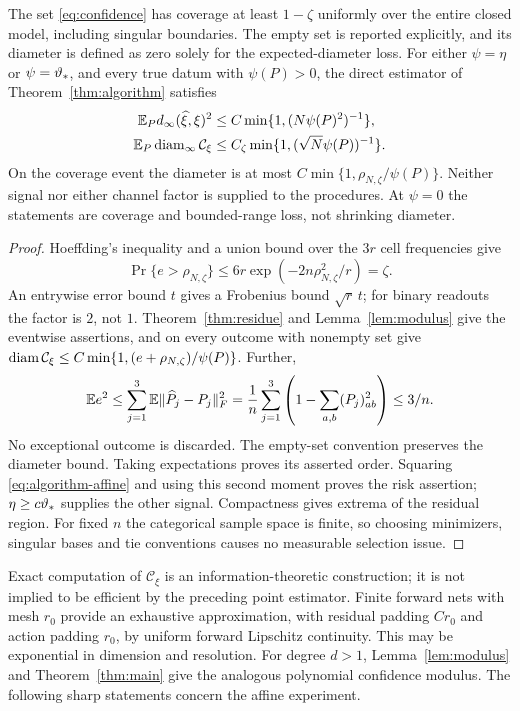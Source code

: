 \begin{theorem}\label{thm:upper}
The set \eqref{eq:confidence} has coverage at least $1-\zeta$
uniformly over the entire closed model, including singular boundaries.
The empty set is reported explicitly, and its diameter is defined as
zero solely for the expected-diameter loss. For either
$\psi=\eta$ or $\psi=\vartheta_*$, and every true datum with $\psi(P)>0$,
the direct estimator of Theorem~\ref{thm:algorithm} satisfies
\begin{align}
 \mathbb E_P d_\infty(\widehat\xi,\xi)^2
      &\le C\min\{1,(N\psi(P)^2)^{-1}\},\nonumber\\
 \mathbb E_P\operatorname{diam}_\infty\mathcal C_\xi
      &\le C_\zeta\min\{1,(\sqrt N\psi(P))^{-1}\}.
                                                        \label{eq:stat-upper}
\end{align}
On the coverage event the diameter is at most
$C\min\{1,\rho_{N,\zeta}/\psi(P)\}$.
Neither signal nor either channel factor is supplied to the procedures.
At $\psi=0$ the statements are coverage and bounded-range loss, not
shrinking diameter.
\end{theorem}
\begin{proof}
Hoeffding's inequality and a union bound over the $3r$ cell frequencies
give
\[
 \Pr\{e>\rho_{N,\zeta}\}
       \le6r\exp(-2n\rho_{N,\zeta}^2/r)=\zeta.
\]
An entrywise error bound $t$ gives a Frobenius bound $\sqrt r\,t$;
for binary readouts the factor is $2$, not $1$.
Theorem~\ref{thm:residue} and Lemma~\ref{lem:modulus} give the
eventwise assertions, and on every outcome with nonempty set give
$\operatorname{diam}\mathcal C_\xi\le C\min\{1,(e+\rho_{N,\zeta})/\psi(P)\}$.
Further,
\[
 \mathbb E e^2\le\sum_{j=1}^3\mathbb E\|\widehat P_j-P_j\|_F^2
       =\frac1n\sum_{j=1}^3
              \left(1-\sum_{a,b}(P_j)_{ab}^2\right)\le3/n.
\]
No exceptional outcome is discarded. The empty-set convention
preserves the diameter bound. Taking expectations proves its asserted
order. Squaring \eqref{eq:algorithm-affine} and using this second
moment proves the risk assertion; $\eta\ge c\vartheta_*$ supplies the
other signal. Compactness gives extrema of the residual region. For
fixed $n$ the categorical sample space is finite, so choosing
minimizers, singular bases and tie conventions causes no measurable
selection issue.
\end{proof}

Exact computation of $\mathcal C_\xi$ is an information-theoretic
construction; it is not implied to be efficient by the preceding
point estimator. Finite forward nets with mesh $r_0$ provide an
exhaustive approximation, with residual padding $Cr_0$ and action
padding $r_0$, by uniform forward Lipschitz continuity. This may be
exponential in dimension and resolution. For degree $d>1$,
Lemma~\ref{lem:modulus} and Theorem~\ref{thm:main} give the analogous
polynomial confidence modulus. The following sharp statements concern
the affine experiment.

